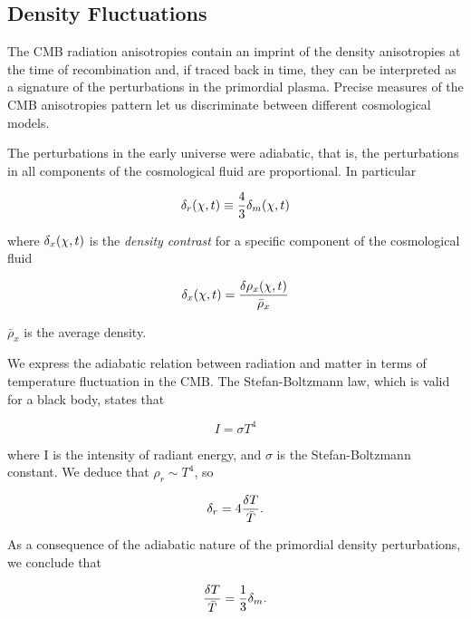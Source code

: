 \subsection{Density Fluctuations}

The CMB radiation anisotropies contain an imprint of the density
anisotropies at the time of recombination and, if traced back in time, they
can be interpreted as a signature of the perturbations in the primordial
plasma.  Precise measures of the CMB anisotropies pattern let us
discriminate between different cosmological models.

The perturbations in the early universe were adiabatic, that is, the
perturbations in all components of the cosmological fluid are proportional.
In particular

\begin{equation}
        \delta_r\qty(\vb{\chi},t) \equiv \frac{4}{3} \delta_m\qty(\vb{\chi},t)
\end{equation}

where $\delta_x\qty(\vb{\chi},t)$ is the \emph{density contrast} for a
specific component of the cosmological fluid

\begin{equation}
        \delta_x\qty(\vb{\chi},t) = \frac{\var{\rho_x\qty(\vb{\chi},t)}}{\bar \rho_x}
\end{equation}

$\bar \rho_x$ is the average density.

We express the adiabatic relation between radiation and matter in terms of
temperature fluctuation in the CMB. The Stefan-Boltzmann law, which is
valid for a black body, states that

\begin{equation}
        I = \sigma T^4
\end{equation}

where I is the intensity of radiant energy, and $\sigma$ is the
Stefan-Boltzmann constant. We deduce that $\rho_r \sim T^4$, so

\begin{equation}
        \delta_r = 4 \frac{\var{T}}{\bar T}.
\end{equation}

As a consequence of the adiabatic nature of the primordial density
perturbations, we conclude that

\begin{equation}
        \frac{\var{T}}{\bar T} = \frac{1}{3} \delta_m.
\end{equation}

